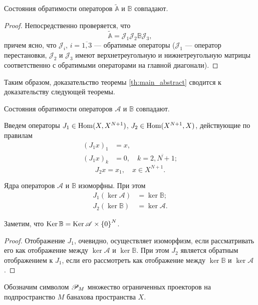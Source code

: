 \begin{lemma}
    Состояния обратимости операторов $\widetilde{\mathbb A}$ и $\mathbb B$ совпадают.
\end{lemma}

\begin{proof}
Непосредственно проверяется, что
\[ \widetilde{\mathbb A} = \mathcal J_1 \mathcal J_2 \mathbb B \mathcal J_3, \]
причем ясно, что $\mathcal J_i$, $i = \overline{1,3}$ --- обратимые операторы ($\mathcal J_1$ --- оператор перестановки, $\mathcal J_2$ и $\mathcal J_3$ имеют верхнетреугольную и нижнетреугольную матрицы соответственно с обратимыми операторами на главной диагонали).
\end{proof}

Таким образом, доказательство теоремы \ref{th:main_abstract} сводится к доказательству следующей теоремы.
\begin{theorem}\label{th:bigth}
    Состояния обратимости операторов $\mathcal A$ и $\mathbb B$ совпадают.
\end{theorem}

Введем операторы $ J_1 \hm\in \Hom(X, X^{N+1})$, $ J_2 \in \operatorname{Hom}(X^{N+1}, X)$, действующие по правилам
\begin{align*}
    ( J_1 x)_1 &= x, \\
    ( J_1 x)_k &= 0, \quad k = \overline{2,N+1};
\end{align*}
\[  J_2x = x_1, \quad x \in X^{N+1}. \]

\begin{lemma}\label{le:keris}
    Ядра операторов $\mathcal A$ и $\mathbb B$ изоморфны. При этом
    \begin{align*}
         J_1(\ker \mathcal A) &= \ker \mathbb B; \\
         J_2(\ker \mathbb B) &= \ker \mathcal A.
    \end{align*}
\end{lemma}

Заметим, что $\operatorname{Ker} \mathbb B = \operatorname{Ker} \mathcal A \times \left\{0\right\}^{N}$.

\begin{proof}
    Отображение $J_1$, очевидно, осуществляет изоморфизм, если рассматривать его как отображение между $\ker \mathcal A$ и $\ker \mathbb B$. При этом $ J_2$ является обратным отображением к $ J_1$, если его рассмотреть как отображение между $\ker \mathbb B$ и $\ker \mathcal A$.
\end{proof}

Обозначим символом $\mathcal P_{M}$ множество ограниченных проекторов на подпространство $M$ банахова пространства $X$.

